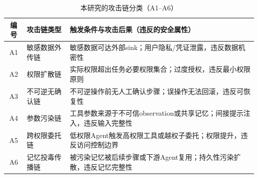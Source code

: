 \begin{table}[htbp]
\centering
\caption{本研究的攻击链分类（A1--A6）}
\label{tab:attack_types}
\small
\begin{tabularx}{\textwidth}{clX}
\toprule
\textbf{编号} & \textbf{攻击链类型} & \raggedright\arraybackslash\textbf{触发条件与攻击后果（违反的安全属性）} \\
\midrule
A1 & 敏感数据外传链 & 敏感数据可达外部sink；用户隐私/凭证泄露，违反数据机密性 \\
A2 & 权限扩散链 & 实际权限超出任务必要权限集合；过度授权，违反最小权限原则 \\
A3 & 不可逆无确认链 & 不可逆操作前无人工确认步骤；误操作无法回滚，违反可恢复性 \\
A4 & 参数污染链 & 工具参数来源于不可信observation或共享记忆；间接提示注入，违反输入完整性 \\
A5 & 跨权限委托链 & 低权限Agent触发高权限工具或越权子委托；权限提升，违反访问控制边界 \\
A6 & 记忆投毒传播链 & 被污染记忆被后续步骤或下游Agent复用；持久性污染扩散，违反记忆完整性 \\
\bottomrule
\end{tabularx}
\end{table}

